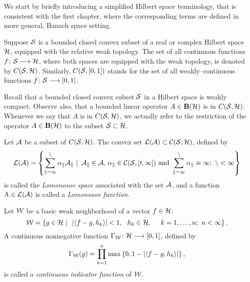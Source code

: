 \medskip

We start by briefly introducing a simplified Hilbert space
terminology, that is consistent with the first chapter, where
the corresponding terms are defined in more general, Banach
space setting.

\smallskip

\begin{defn}
Suppose ${\cal S}$ is a bounded closed convex subset of a real or
complex Hilbert space ${\cal H}$, equipped with the relative weak
topology. The set of all continuous functions $f\colon{\cal S}\longrightarrow{\cal H}$,
where both spaces are equipped with the weak topology, is
denoted by $C({\cal S},{\cal H})$. Similarly, $C({\cal S},[0,1])$ stands for the
set of all weakly--continuous functions $f\colon{\cal S}\longrightarrow[0,1]$.
\end{defn}

\smallskip

\begin{rem}
Recall that a bounded closed convex subset ${\cal S}$ in a Hilbert
space is weakly compact. Observe also, that a bounded linear
operator $A\in\mathbf B(\cal H)$ is in $C({\cal S},{\cal H})$. Whenever we say that $A$
is in $C({\cal S},{\cal H})$, we actually refer to the restriction of the
operator $A\in\mathbf B(\cal H)$ to the subset ${\cal S}\subset{\cal H}$.
\end{rem}

\bigskip

\goodbreak

\begin{defn}
Let ${\cal A}$ be a subset of $C({\cal S},{\cal H})$. The convex set $\cal{L}({\cal A})
\subset C({\cal S},{\cal H})$, defined by
\[ \cal{L}({\cal A}) = \left\{ \sum_{k=1}^n \alpha_k A_k\,\,|\,\,\, A_k\in{\cal A},\,
   \alpha_k\in C({\cal S},[0,1]) \text{ and } \sum_{k=1}^n\alpha_k \equiv 1;
    \,\, n < \infty\right\} \]
is called the {\em Lomonosov space} associated with the set
${\cal A}$, and a function $\Lambda\in\cal{L}({\cal A})$ is called a {\em
Lomonosov function}.
\end{defn}

\medskip

\begin{defn}
Let ${\cal W}$ be a basic weak neighborhood of a vector $f\in{\cal H}$:
\begin{equation}\label{e:WeakBase}
 {\cal W}=\left\{g\in{\cal H}\,\,|\,\,\,\left\vert\left<f-g,h_k\right>\right\vert < 1, ~~ h_k\in{\cal H}, ~~~~
    k=1,\ldots,n; \,\, n < \infty\right\}.
\end{equation}
A continuous nonnegative function $\Gamma_{\cal W}\colon{\cal H}\longrightarrow[0,1]$,
defined by
\begin{equation}\label{e:CIF}
  \Gamma_{\cal W}(g)= \prod_{k=1}^n \max\left\{0,1-\left\vert\left<f-g,h_k\right>\right\vert\right\},
\end{equation}
is called a {\em continuous indicator function} of ${\cal W}$.
\end{defn}

